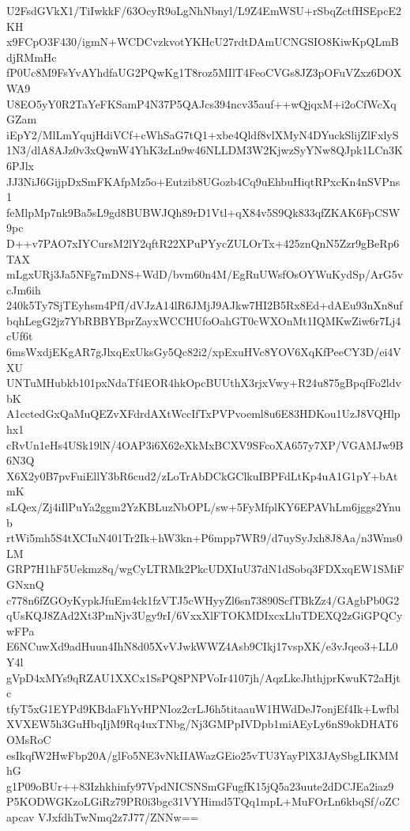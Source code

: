 U2FsdGVkX1/TiIwkkF/63OcyR9oLgNhNbnyl/L9Z4EmWSU+rSbqZctfHSEpcE2KH
x9FCpO3F430/igmN+WCDCvzkvotYKHcU27rdtDAmUCNGSIO8KiwKpQLmBdjRMmHc
fP0Uc8M9FsYvAYhdfaUG2PQwKg1T8roz5MIlT4FeoCVGs8JZ3pOFuVZxz6DOXWA9
U8EO5yY0R2TaYeFKSamP4N37P5QAJcs394ncv35auf++wQjqxM+i2oCfWcXqGZam
iEpY2/MlLmYqujHdiVCf+cWhSaG7tQ1+xbe4Qldf8vlXMyN4DYuckSlijZlFxlyS
1N3/dlA8AJz0v3xQwnW4YhK3zLn9w46NLLDM3W2KjwzSyYNw8QJpk1LCn3K6PJlx
JJ3NiJ6GijpDxSmFKAfpMz5o+Eutzib8UGozb4Cq9uEhbuHiqtRPxcKn4nSVPns1
feMlpMp7nk9Ba5sL9gd8BUBWJQh89rD1Vtl+qX84v5S9Qk833qfZKAK6FpCSW9pc
D++v7PAO7xIYCursM2lY2qftR22XPuPYycZULOrTx+425znQnN5Zzr9gBeRp6TAX
mLgxURj3Ja5NFg7mDNS+WdD/bvm60n4M/EgRuUWsfOsOYWuKydSp/ArG5vcJm6ih
240k5Ty7SjTEyhsm4PfI/dVJzA14lR6JMjJ9AJkw7HI2B5Rx8Ed+dAEu93nXn8uf
bqhLegG2jz7YbRBBYBprZayxWCCHUfoOahGT0cWXOnMt1IQMKwZiw6r7Lj4cUf6t
6msWxdjEKgAR7gJlxqExUksGy5Qc82i2/xpExuHVc8YOV6XqKfPeeCY3D/ei4VXU
UNTuMHubkb101pxNdaTf4EOR4hkOpcBUUthX3rjxVwy+R24u875gBpqfFo2ldvbK
A1cctedGxQaMuQEZvXFdrdAXtWccIfTxPVPvoeml8u6E83HDKou1UzJ8VQHlphx1
cRvUn1eHs4USk19lN/4OAP3i6X62eXkMxBCXV9SFcoXA657y7XP/VGAMJw9B6N3Q
X6X2y0B7pvFuiEllY3bR6cud2/zLoTrAbDCkGClkuIBPFdLtKp4uA1G1pY+bAtmK
sLQex/Zj4iIlPuYa2ggm2YzKBLuzNbOPL/sw+5FyMfplKY6EPAVhLm6jggs2Ynub
rtWi5mh5S4tXCIuN401Tr2Ik+hW3kn+P6mpp7WR9/d7uySyJxh8J8Aa/n3Wms0LM
GRP7H1hF5Uekmz8q/wgCyLTRMk2PkcUDXIuU37dN1dSobq3FDXxqEW1SMiFGNxnQ
c778n6fZGOyKypkJfuEm4ck1fzVTJ5cWHyyZl6sn73890ScfTBkZz4/GAgbPb0G2
qUsKQJ8ZAd2Xt3PmNjv3Ugy9rI/6VxxXlFTOKMDIxcxLluTDEXQ2zGiGPQCywFPa
E6NCuwXd9adHuun4IhN8d05XvVJwkWWZ4Asb9CIkj17vspXK/e3vJqeo3+LL0Y4l
gVpD4xMYs9qRZAU1XXCx1SsPQ8PNPVoIr4107jh/AqzLkcJhthjprKwuK72aHjtc
tfyT5xG1EYPd9KBdaFhYvHPNIoz2crLJ6h5titaauW1HWdDeJ7onjEf4Ik+Lwfbl
XVXEW5h3GuHbqIjM9Rq4uxTNbg/Nj3GMPpIVDpb1miAEyLy6nS9okDHAT6OMsRoC
esIkqfW2HwFbp20A/glFo5NE3vNkIIAWazGEio25vTU3YayPlX3JAySbgLIKMMhG
g1P09oBUr++83Izhkhinfy97VpdNICSNSmGFugfK15jQ5a23uute2dDCJEa2iaz9
P5KODWGKzoLGiRz79PR0i3bgc31VYHimd5TQq1mpL+MuFOrLn6kbqSf/oZCapcav
VJxfdhTwNmq2z7J77/ZNNw==
